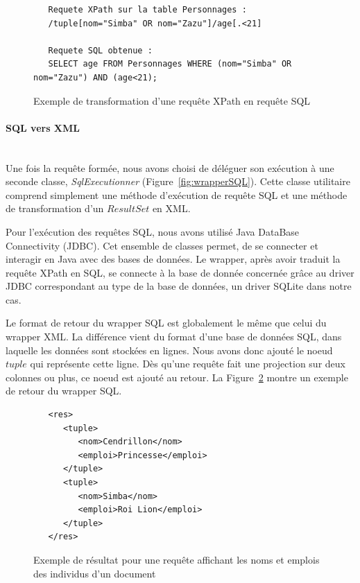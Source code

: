 \documentclass[a4paper,10pt]{article}
\newcommand{\fref}[1]{Figure~\ref{#1}}
\begin{document}
\begin{figure}[ht!]
\begin{verbatim}
   Requete XPath sur la table Personnages :
   /tuple[nom="Simba" OR nom="Zazu"]/age[.<21]
  
   Requete SQL obtenue :
   SELECT age FROM Personnages WHERE (nom="Simba" OR nom="Zazu") AND (age<21);
\end{verbatim}
\caption{Exemple de transformation d'une requête XPath en requête SQL}
\label{ex:XPathToSql}
\end{figure}

\FloatBarrier
\paragraph{SQL vers XML}~~\\

Une fois la requête formée, nous avons choisi de déléguer son exécution à une seconde classe, \emph{SqlExecutionner} (\fref{fig:wrapperSQL}). Cette classe utilitaire comprend simplement une méthode d'exécution de requête SQL et une méthode de transformation d'un \(ResultSet\) en XML.

Pour l'exécution des requêtes SQL, nous avons utilisé Java DataBase Connectivity (JDBC). Cet ensemble de classes permet, de se connecter et interagir en Java avec des bases de données. Le wrapper, après avoir traduit la requête XPath en SQL, se connecte à la base de donnée concernée grâce au driver JDBC correspondant au type de la base de données, un driver SQLite dans notre cas.

Le format de retour du wrapper SQL est globalement le même que celui du wrapper XML. La différence vient du format d'une base de données SQL, dans laquelle les données sont stockées en lignes. Nous avons donc ajouté le noeud \(tuple\) qui représente cette ligne. Dès qu'une requête fait une projection sur deux colonnes ou plus, ce noeud est ajouté au retour. La \fref{lst:retourTuple} montre un exemple de retour du wrapper SQL.

\begin{figure}[ht!]
\begin{verbatim}
   <res>
      <tuple>
         <nom>Cendrillon</nom>
         <emploi>Princesse</emploi>
      </tuple>
      <tuple>
         <nom>Simba</nom>
         <emploi>Roi Lion</emploi>
      </tuple>
   </res>
\end{verbatim}
\caption{Exemple de résultat pour une requête affichant les noms et emplois des individus d'un document}
\label{lst:retourTuple}
\end{figure}
\end{document}
